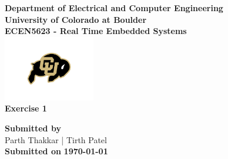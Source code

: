 \begin{titlepage}
\center %

\textbf{\large Department of Electrical and Computer Engineering}\\[0.5cm]
\textbf{\Large University of Colorado at Boulder}\\[1cm]
\textbf{\large ECEN5623 - Real Time Embedded Systems }\\[2cm]
\includegraphics[width=0.3\textwidth]{figures/cu}\\[2cm]

	
\textbf{\Huge Exercise 1 }\\[0.2cm]





\vfill

\textbf{\large Submitted by}\\[0.5cm]

{\large Parth Thakkar | Tirth Patel}\\[0.5cm]	


\textbf{\large Submitted on}
\textbf{\Large \today} %


\vfill %

\end{titlepage}